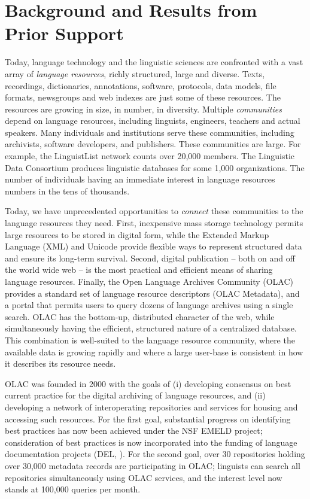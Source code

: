 \section{Background and Results from Prior Support}

Today, language technology and the linguistic sciences are confronted
with a vast array of \emph{language resources}, richly structured,
large and diverse.  Texts, recordings, dictionaries, annotations,
software, protocols, data models, file formats, newsgroups and web
indexes are just some of these resources.  The resources are growing
in size, in number, in diversity.  Multiple \emph{communities} depend
on language resources, including linguists, engineers, teachers and
actual speakers.  Many individuals and institutions serve these
communities, including archivists, software developers, and
publishers.  These communities are large.  For example, the
LinguistList network counts over 20,000 members.  The Linguistic Data
Consortium produces linguistic databases for some 1,000 organizations.
The number of individuals having an immediate interest in language
resources numbers in the tens of thousands.

Today, we have unprecedented opportunities to \emph{connect} these
communities to the language resources they need.  First, inexpensive
mass storage technology permits large resources to be stored in
digital form, while the Extended Markup Language (XML) and Unicode
provide flexible ways to represent structured data and ensure its
long-term survival.  Second, digital publication -- both on and off
the world wide web -- is the most practical and efficient means of
sharing language resources.  Finally, the Open Language Archives
Community (OLAC) provides a standard set of language resource
descriptors (OLAC Metadata), and a portal that permits users to query
dozens of language archives using a single search.  OLAC has the
bottom-up, distributed character of the web, while simultaneously
having the efficient, structured nature of a centralized database.
This combination is well-suited to the language resource community,
where the available data is growing rapidly and where a large
user-base is consistent in how it describes its resource needs.

OLAC was founded in 2000 with the goals of (i) developing consensus on
best current practice for the digital archiving of language resources,
and (ii) developing a network of interoperating repositories and
services for housing and accessing such resources.  For the first
goal, substantial progress on identifying best practices has now been
achieved under the NSF EMELD project; consideration of best practices
is now incorporated into the funding of language documentation
projects (DEL, \citet{BirdSimons03language}).  For the second goal,
over 30 repositories holding over 30,000 metadata records are
participating in OLAC; linguists can search all repositories
simultaneously using OLAC services, and the interest level now stands
at 100,000 queries per month.

